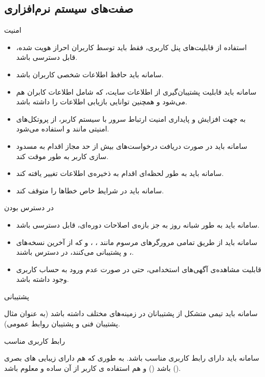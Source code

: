 \documentclass[12pt,svgnames,oneside]{book}
\newcounter{itemadded}
\let\LaTeXStandardEnumerateBegin\enumerate
\let\LaTeXStandardEnumerateEnd\endenumerate
\renewenvironment{enumerate}{%
\LaTeXStandardEnumerateBegin%
\setcounter{itemadded}{0}
}{%
\LaTeXStandardEnumerateEnd%
}%
\begin{document}
\subsection{صفت‌های سیستم‌ نرم‌افزاری}
\begin{enumerate}
\item امنیت
\begin{itemize}
\item استفاده از قابلیت‌های پنل کاربری، فقط باید توسط کاربران احراز هویت شده، قابل دسترسی باشد.
\item سامانه باید حافظ اطلاعات شخصی کاربران باشد.
\item سامانه باید قابلیت پشتیبان‌گیری از اطلاعات سایت، که شامل اطلاعات کابران هم می‌شود و همچنین توانایی بازیابی اطلاعات را داشته باشد.
\item به جهت افزایش و پایداری امنیت ارتباط سرور با سیستم کاربر، از پروتکل‌های امنیتی مانند  و  استفاده می‌شود.
\item سامانه باید در صورت دریافت درخواست‌های بیش از حد مجاز اقدام به مسدود سازی کاربر به طور موقت کند.
\item سامانه باید به طور لحظه‌ای اقدام به ذخیره‌ی اطلاعات تغییر یافته کند.
\item سامانه باید در شرایط خاص خطاها را متوقف کند.
\end{itemize}

\item در دسترس بودن
\begin{itemize}
	\item سامانه باید به طور شبانه روز به جز بازه‌ی اصلاحات دوره‌ای، قابل دسترسی باشد.
	\item
	سامانه باید از طریق تمامی مرورگر‌های مرسوم مانند
	،
	،
	و
	که از آخرین نسخه‌های
	،
	و
	پشتیبانی می‌کنند، در دسترس باشند.
	\item
	قابلیت مشاهده‌ی آگهی‌های استخدامی، حتی در صورت عدم ورود به حساب کاربری وجود داشته باشد.
\end{itemize}

\item پشتیبانی

سامانه باید تیمی متشکل از پشتیبانان در زمینه‌های مختلف داشته باشد (به عنوان مثال پشتیبان فنی و پشتیبان روابط عمومی).

\item رابط کاربری مناسب

سامانه باید دارای رابط کاربری مناسب باشد. به طوری که هم دارای زیبایی های بصری باشد () و هم استفاده ی کاربر از آن ساده و معلوم باشد ().

\end{enumerate}
\end{document}
